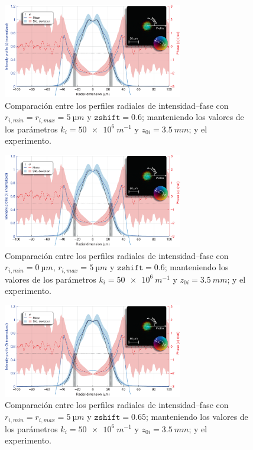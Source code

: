 \begin{figure}[htbp]
  \centering
  \includegraphics[width=0.7\textwidth]{Figuras/anx_cmp_43.png}
  \caption*{Comparación entre los perfiles radiales de intensidad--fase con $r_{i,min}=r_{i,max}=\qty{5}{µm}$ y $\texttt{zshift}=0.6$; manteniendo los valores de los parámetros $k_{i}=\qty{50e6}{m^{-1}}$ y $z_{0i}=\qty{3.5}{mm}$; y el experimento.}
\end{figure}

\begin{figure}[htbp]
  \centering
  \includegraphics[width=0.7\textwidth]{Figuras/anx_cmp_44.png}
  \caption*{Comparación entre los perfiles radiales de intensidad--fase con $r_{i,min}=\qty{0}{µm}$, $r_{i,max}=\qty{5}{µm}$ y $\texttt{zshift}=0.6$; manteniendo los valores de los parámetros $k_{i}=\qty{50e6}{m^{-1}}$ y $z_{0i}=\qty{3.5}{mm}$; y el experimento.}
\end{figure}

\begin{figure}[htbp]
  \centering
  \includegraphics[width=0.7\textwidth]{Figuras/anx_cmp_45.png}
  \caption*{Comparación entre los perfiles radiales de intensidad--fase con $r_{i,min}=r_{i,max}=\qty{5}{µm}$ y $\texttt{zshift}=0.65$; manteniendo los valores de los parámetros $k_{i}=\qty{50e6}{m^{-1}}$ y $z_{0i}=\qty{3.5}{mm}$; y el experimento.}
\end{figure}

